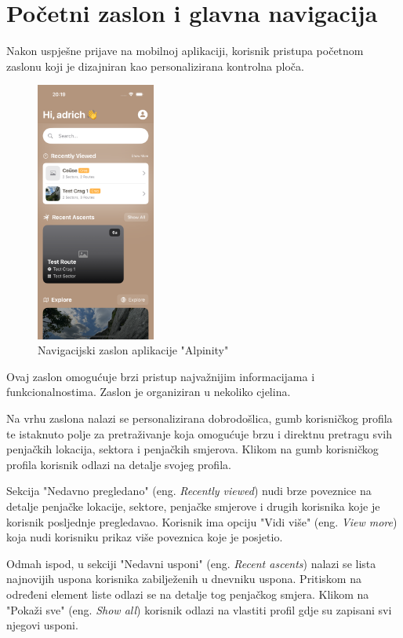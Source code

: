 \section{Početni zaslon i glavna navigacija}

Nakon uspješne prijave na mobilnoj aplikaciji, korisnik pristupa početnom zaslonu koji je dizajniran kao personalizirana kontrolna ploča. 

\begin{figure}[H]
    \centering
    \includegraphics[width=0.35\textwidth]{images/implementacija/main_nav_1.png}
    \caption{Navigacijski zaslon aplikacije "Alpinity"}
    \label{fig:početni_zaslon}
\end{figure}

Ovaj zaslon omogućuje brzi pristup najvažnijim informacijama i funkcionalnostima. Zaslon je organiziran u nekoliko cjelina.

Na vrhu zaslona nalazi se personalizirana dobrodošlica, gumb korisničkog profila te istaknuto polje za pretraživanje koja omogućuje brzu i direktnu pretragu svih penjačkih lokacija, sektora i penjačkih smjerova. Klikom na gumb korisničkog profila korisnik odlazi na detalje svojeg profila.

Sekcija "Nedavno pregledano" (eng. \textit{Recently viewed}) nudi brze poveznice na detalje penjačke lokacije, sektore, penjačke smjerove i drugih korisnika koje je korisnik posljednje pregledavao. Korisnik ima opciju "Vidi više" (eng. \textit{View more}) koja nudi korisniku prikaz više poveznica koje je posjetio.

Odmah ispod, u sekciji "Nedavni usponi" (eng. \textit{Recent ascents}) nalazi se lista najnovijih uspona korisnika zabilježenih u dnevniku uspona. Pritiskom na određeni element liste odlazi se na detalje tog penjačkog smjera. Klikom na "Pokaži sve" (eng. \textit{Show all}) korisnik odlazi na vlastiti profil gdje su zapisani svi njegovi usponi. 

